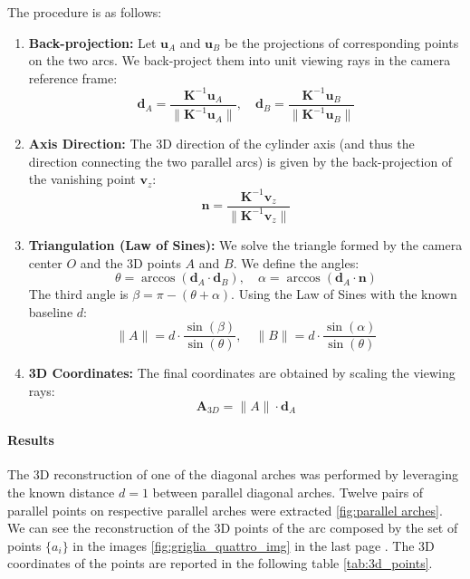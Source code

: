 \documentclass[a4paper,11pt]{article}
\newcommand{\matr}[1]{\bm{#1}}     %
\newcommand{\vect}[1]{\mathbf{#1}}  %
\begin{document}
The procedure is as follows:
\begin{enumerate}
    \item \textbf{Back-projection:} Let $\vect{u}_A$ and $\vect{u}_B$ be the projections of corresponding points on the two arcs. We back-project them into unit viewing rays in the camera reference frame:
    \begin{equation}
        \vect{d}_A = \frac{\matr{K}^{-1}\vect{u}_A}{\|\matr{K}^{-1}\vect{u}_A\|}, \quad \vect{d}_B = \frac{\matr{K}^{-1}\vect{u}_B}{\|\matr{K}^{-1}\vect{u}_B\|}
    \end{equation}
    
    \item \textbf{Axis Direction:} The 3D direction of the cylinder axis (and thus the direction connecting the two parallel arcs) is given by the back-projection of the vanishing point $\vect{v}_z$:
    \begin{equation}
        \vect{n} = \frac{\matr{K}^{-1}\vect{v}_z}{\|\matr{K}^{-1}\vect{v}_z\|}
    \end{equation}
    
    \item \textbf{Triangulation (Law of Sines):} We solve the triangle formed by the camera center $O$ and the 3D points $A$ and $B$. We define the angles:
    \begin{equation}
        \theta = \arccos(\vect{d}_A \cdot \vect{d}_B), \quad \alpha = \arccos(\vect{d}_A \cdot \vect{n})
    \end{equation}
    The third angle is $\beta = \pi - (\theta + \alpha)$. Using the Law of Sines with the known baseline $d$:
    \begin{equation}
        \|A\| = d \cdot \frac{\sin(\beta)}{\sin(\theta)}, \quad \|B\| = d \cdot \frac{\sin(\alpha)}{\sin(\theta)}
    \end{equation}
    
    \item \textbf{3D Coordinates:} The final coordinates are obtained by scaling the viewing rays:
    \begin{equation}
        \vect{A}_{3D} = \|A\| \cdot \vect{d}_A
    \end{equation}
\end{enumerate}

\paragraph{Results}
The 3D reconstruction of one of the diagonal arches was performed by leveraging the known distance $d = 1$ between parallel diagonal arches. Twelve pairs of parallel points on respective parallel arches were extracted \ref{fig:parallel arches}. We can see the reconstruction of the 3D points of the arc composed by the set of points $\{a_i\}$ in the images \ref{fig:griglia_quattro_img} in the last page . The 3D coordinates of the points are reported in the following table \ref{tab:3d_points}.
\end{document}
